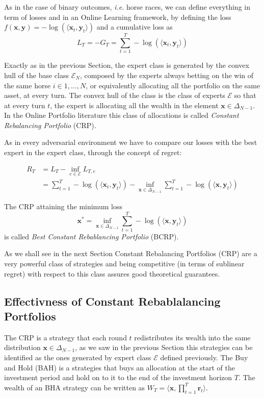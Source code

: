 As in the case of binary outcomes, \emph{i.e.} horse races, we can define everything in term of losses and in an Online Learning framework, by defining the loss $f(\mathbf x,\mathbf y)=-\log(\langle\mathbf x_t, \mathbf y_t\rangle)$ and a cumulative loss as 
$$L_T=-G_T=\sum\limits_{t=1}^T-\log(\langle\mathbf x_t,\mathbf y_t\rangle)$$

Exactly as in the previous Section, the expert class is generated by the convex hull of the base class $\mathcal E_N$, composed by the experts always betting on the win of the same horse $i\in1,\ldots,N$, or equivalently allocating all the portfolio on the same asset, at every turn. The convex hull of the class is the class of experts $\mathcal E$ so that at every turn $t$, the expert is allocating all the wealth in the element $\mathbf x\in\Delta_{N-1}$. In the Online Portfolio literature this class of allocations is called \emph{Constant Rebalancing Portfolio} (CRP).  

As in every adversarial environment we have to compare our losses with the best expert in the expert class, through the concept of regret:

\begin{align}
R_T&=L_T-\inf\limits_{e\in \mathcal E}L_{T,e}\\
&=\sum\limits_{t=1}^T-\log(\langle\mathbf x_t,\mathbf y_t\rangle)-\inf\limits_{\mathbf x\in\Delta_{N-1}}\sum\limits_{t=1}^T-\log(\langle\mathbf x,\mathbf y_t\rangle)
\end{align}

The CRP attaining the minimum loss 
$$\mathbf x^*=\inf\limits_{\mathbf x \in \Delta_{N-1}}\sum\limits_{t=1}^T-\log(\langle\mathbf x,\mathbf y_t\rangle)$$
is called \emph{Best Constant Rebablancing Portfolio} (BCRP).

As we shall see in the next Section Constant Rebalancing Portfolios (CRP) are a very powerful class of strategies and being competitive (in terms of sublinear regret) with respect to this class assures good theoretical guarantees. 

\subsection{Effectivness of Constant Rebablalancing Portfolios}

The CRP is a strategy that each round $t$ redistributes its wealth into the same distribution $\mathbf x\in\Delta_{N-1}$, as we saw in the previous Section this strategies can be identified as the ones generated by expert class $\mathcal E$ defined previously.
The Buy and Hold (BAH) is a strategies that buys an allocation at the start of the investment period and hold on to it to the end of the investment horizon $T$. The wealth of an BHA strategy can be written as $W_T=\langle\mathbf x, \prod_{t=1}^T \mathbf r_t\rangle$.

